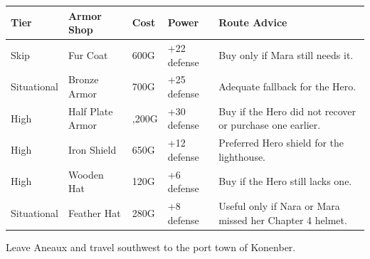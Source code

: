 \documentclass[
  american,
  10pt,
  letterpaper,
  oneside,
  open=any]{scrreprt}
\newcounter{none} %
\newenvironment{guidetable}{%
  \small\setstretch{1.0}%
  \setlength{\tabcolsep}{4pt}%
  \setlength{\LTpre}{8pt}\setlength{\LTpost}{10pt}%
  \renewcommand{\arraystretch}{1.16}%
}{ }
\begin{document}
\begin{guidetable}

{\def\LTcaptype{none} %
\begin{longtable}[]{@{}
  >{\raggedright\arraybackslash}p{}
  >{\raggedright\arraybackslash}p{}
  >{\raggedleft\arraybackslash}p{}
  >{\raggedleft\arraybackslash}p{}
  >{\raggedright\arraybackslash}p{}@{}}
\toprule\noalign{}
\begin{minipage}[b]{\linewidth}\raggedright
\color{GuideGreen}\bfseries Tier
\end{minipage} & \begin{minipage}[b]{\linewidth}\raggedright
\color{GuideGreen}\bfseries Armor Shop
\end{minipage} & \begin{minipage}[b]{\linewidth}\raggedleft
\color{GuideGreen}\bfseries Cost
\end{minipage} & \begin{minipage}[b]{\linewidth}\raggedleft
\color{GuideGreen}\bfseries Power
\end{minipage} & \begin{minipage}[b]{\linewidth}\raggedright
\color{GuideGreen}\bfseries Route Advice
\end{minipage} \\
\midrule\noalign{}
\endhead
\bottomrule\noalign{}
\endlastfoot
Skip & Fur Coat & 600G & +22 defense & Buy only if Mara still needs
it. \\
Situational & Bronze Armor & 700G & +25 defense & Adequate fallback for
the Hero. \\
High & Half Plate Armor & 1,200G & +30 defense & Buy if the Hero did not
recover or purchase one earlier. \\
High & Iron Shield & 650G & +12 defense & Preferred Hero shield for the
lighthouse. \\
High & Wooden Hat & 120G & +6 defense & Buy if the Hero still lacks
one. \\
Situational & Feather Hat & 280G & +8 defense & Useful only if Nara or
Mara missed her Chapter 4 helmet. \\
\end{longtable}
}

\end{guidetable}

Leave Aneaux and travel southwest to the port town of Konenber.
\end{document}

